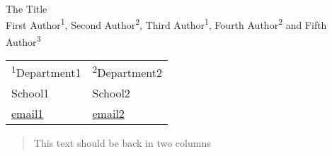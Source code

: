 \documentclass{article}
\newcommand\Mark[1]{\textsuperscript#1}
\begin{document}
\onecolumn
\begingroup
\centering
{\LARGE The Title \\[1.5em]
\large First Author\Mark{1}, Second Author\Mark{2}, Third Author\Mark{1}, Fourth Author\Mark{2} and Fifth Author\Mark{3}}\\[1em]
\begin{tabular}{*{2}{>{\centering}p{}}}
\Mark{1}Department1 & \Mark{2}Department2 \tabularnewline
School1 & School2  \tabularnewline
\url{email1} & \url{email2}
\end{tabular}\par
\twocolumn
\endgroup

\begin{abstract}
This text should be back in two columns
\end{abstract}
\end{document}
